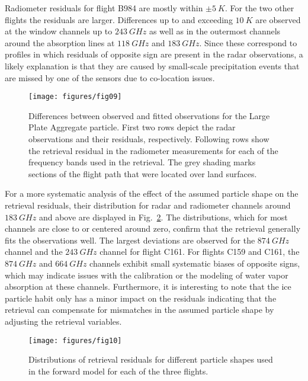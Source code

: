 \documentclass[journal abbreviation, manuscript]{copernicus}
\begin{document}
Radiometer residuals for flight B984 are mostly within $\pm 5\ \unit{K}$. For
the two other flights the residuals are larger. Differences up to and exceeding
$10\ \unit{K}$ are observed at the window channels up to $243\ \unit{GHz}$ as
well as in the outermost channels around the absorption lines at
$118\ \unit{GHz}$ and $183\ \unit{GHz}$. Since these correspond to profiles in
which residuals of opposite sign are present in the radar observations, a likely
explanation is that they are caused by small-scale precipitation events that are
missed by one of the sensors due to co-location issues.


\begin{figure}[!hbpt]
  \centering
  \texttt{[image: figures/fig09]}
  \caption{Differences between observed and fitted observations for the Large
    Plate Aggregate particle. First two rows depict the radar observations and
    their residuals, respectively. Following rows show the retrieval residual in
    the radiometer measurements for each of the frequency bands used in the
    retrieval. The grey shading marks sections of the flight path that were
    located over land surfaces. }
  \label{fig:residuals}
\end{figure}

For a more systematic analysis of the effect of the assumed particle shape on
the retrieval residuals, their distribution for radar and radiometer channels
around $183\ \unit{GHz}$ and above are displayed in
Fig.~\ref{fig:residuals_box}. The distributions, which for most channels are
close to or centered around zero, confirm that the retrieval generally fits the
observations well. The largest deviations are observed for the $874\ \unit{GHz}$
channel and the $243\ \unit{GHz}$ channel for flight C161. For flights C159 and
C161, the $874\ \unit{GHz}$ and $664\ \unit{GHz}$ channels exhibit small
systematic biases of opposite signs, which may indicate issues with the
calibration or the modeling of water vapor absorption at these channels.
Furthermore, it is interesting to note that the ice particle habit only has a
minor impact on the residuals indicating that the retrieval can compensate for
mismatches in the assumed particle shape by adjusting the retrieval variables.


\begin{figure}[!hbpt]
  \centering
  \texttt{[image: figures/fig10]}
  \caption{Distributions of retrieval residuals for different particle
    shapes used in the forward model for each of the three flights.}
  \label{fig:residuals_box}
\end{figure}
\end{document}

